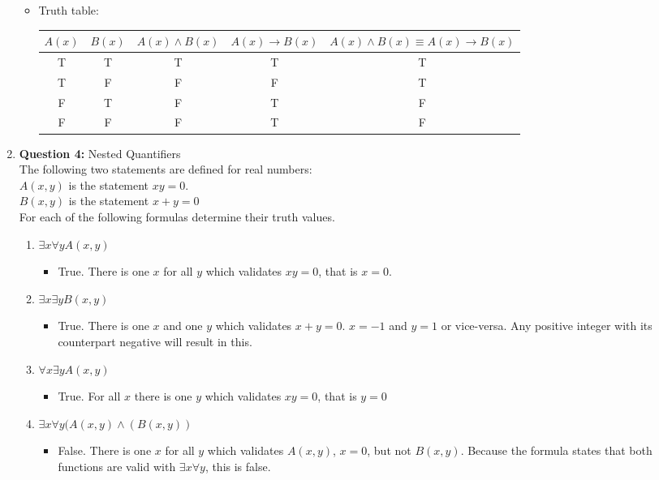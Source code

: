 \documentclass[11pt]{article}
\begin{document}
\begin{enumerate}
\begin{itemize}
    \item 
    Truth table: \\
    \begin{tabular}{|c|c|c|c|c|} \hline
    $A(x)$ & $B(x)$ & $A(x) \wedge B(x)$ & $A(x) \rightarrow B(x)$ & $A(x) \wedge B(x) \equiv A(x) \rightarrow B(x)$ \\
    \hline
    T&T&T&T&T \\
    \hline
    T&F&F&F&T \\
    \hline
    F&T&F&T&F \\
    \hline
    F&F&F&T&F \\
    \hline
    \end{tabular}
\end{itemize}
\item 
\textbf{Question 4:} Nested Quantifiers \\
The following two statements are defined for real numbers: \\
$A(x,y)$ is the statement $xy = 0$. \\
$B(x,y)$ is the statement $x + y = 0$ \\
For each of the following formulas determine their truth values. 
\begin{enumerate}[label=(\alph*)]
\item 
$\exists x \forall y A(x,y)$ 
\begin{itemize}
    \item 
    True. There is one $x$ for all $y$ which validates $xy = 0$, that is $x = 0$. 
\end{itemize}
\item
$\exists x \exists y B(x,y)$ 
\begin{itemize}
    \item 
    True. There is one $x$ and one $y$ which validates $x + y = 0$. $x = -1$ and $y = 1$ or vice-versa. Any positive integer with its counterpart negative will result in this.
\end{itemize}
\item 
$\forall x \exists y A(x,y)$
\begin{itemize}
    \item 
    True. For all $x$ there is one $y$ which validates $xy = 0$, that is $y = 0$
\end{itemize}
\item 
$\exists x \forall y (A(x,y) \wedge (B(x,y))$
\begin{itemize}
    \item 
    False. There is one $x$ for all $y$ which validates $A(x,y)$, $x = 0$, but not $B(x,y)$. Because the formula states that both functions are valid with $\exists x \forall y$, this is false. 

\end{itemize}
\end{enumerate}
\end{enumerate}
\end{document}
